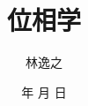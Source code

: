 \documentclass[dvipdfmx]{jarticle}
\theoremstyle{remark}
\theoremstyle{plain}
\newcommand{\jtoday}{\number \year 年 \number \month 月 \number \day 日}
\begin{document}
\title{位相学}
\author{林逸之}
\date{\jtoday}
\maketitle
\tableofcontents
\end{document}
